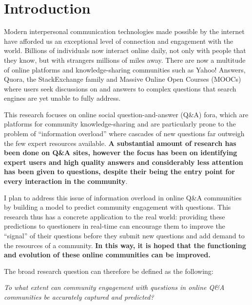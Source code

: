 \documentclass[11pt,preprint, authoryear]{article}
\numberwithin{equation}{section}
\numberwithin{figure}{section}
\begin{document}
\clearpage


\newpage

\section{\texorpdfstring{Introduction
\label{Intro}}{Introduction }}\label{introduction}

Modern interpersonal communication technologies made possible by the
internet have afforded us an exceptional level of connection and
engagement with the world. Billions of individuals now interact online
daily, not only with people that they know, but with strangers millions
of miles away. There are now a multitude of online platforms and
knowledge-sharing communities such as Yahoo! Answers, Quora, the
StackExchange family and Massive Online Open Courses (MOOCs) where users
seek discussions on and answers to complex questions that search engines
are yet unable to fully address.

This research focuses on online social question-and-answer (Q\&A) fora,
which are platforms for community knowledge-sharing and are particularly
prone to the problem of ``information overload'' where cascades of new
questions far outweigh the few expert resources available. \textbf{A
substantial amount of research has been done on Q\&A sites, however the
focus has been on identifying expert users and high quality answers and
considerably less attention has been given to questions, despite their
being the entry point for every interaction in the community}.

I plan to address this issue of information overload in online Q\&A
communities by building a model to predict community engagement with
questions. This research thus has a concrete application to the real
world: providing these predictions to questioners in real-time can
encourage them to improve the ``signal'' of their questions before they
submit new questions and add demand to the resources of a community.
\textbf{In this way, it is hoped that the functioning and evolution of
these online communities can be improved.}

The broad research question can therefore be defined as the following:

\begin{center}
\emph{To what extent can community engagement with questions in online Q\&A communities be accurately captured and predicted?}
\end{center}
\end{document}

